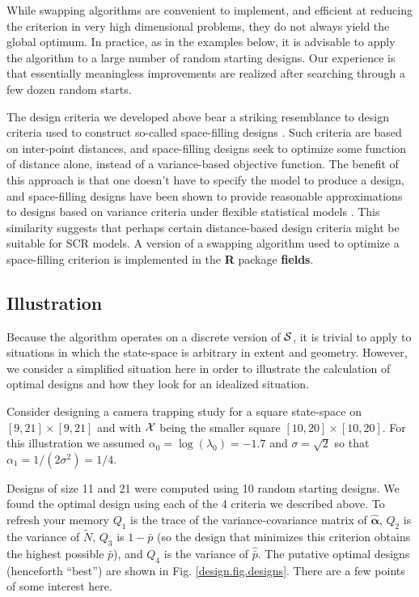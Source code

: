 While swapping algorithms are convenient to implement, and efficient
at reducing the criterion in very high dimensional problems, they do
not always yield the global optimum.  In practice, as in the examples
below, it is advisable to apply the algorithm to a large number of
random starting designs.  Our experience is that essentially
meaningless improvements are realized after searching through a few
dozen random starts.

The design criteria we developed above bear a striking resemblance
to design criteria used to construct so-called space-filling designs
\citep{nychka_etal:1997}. Such criteria are based on inter-point
distances, and space-filling designs seek to optimize some function of
distance alone, instead of a variance-based objective function. The
benefit of this approach is that one doesn't have to specify the model
to produce a design, and space-filling designs have been shown to
provide reasonable approximations to designs based on variance
criteria under flexible
statistical models \citep{nychka_etal:1997}. 
This similarity suggests that perhaps
certain distance-based design criteria might be suitable for SCR
models. A version of a swapping algorithm used to
optimize a space-filling criterion is implemented in the {\bf R}
package {\bf fields}.


\subsection{Illustration}

Because the algorithm operates on a discrete version of ${\cal S}$,
it is trivial to apply to situations in which the
state-space is arbitrary in extent and geometry. However, we consider
a simplified situation here in order to illustrate the calculation of
optimal designs and how they look for an idealized situation.

Consider designing a camera trapping study for a square state-space on
$[9,21] \times [9, 21]$ and with ${\cal X}$ being the smaller square
$[10,20] \times [10,20]$.  For this illustration we assumed
$\alpha_{0} = \log(\lambda_{0}) = -1.7$ and $\sigma=\sqrt{2}$ so that
$\alpha_{1} = 1/(2\sigma^{2}) = 1/4$.

Designs of size 11 and 21 were computed using 10 random starting
designs.  We found the optimal design using each of the 4 criteria we
described above. To refresh your memory $Q_{1}$ is the trace of the
variance-covariance matrix of $\hat{\bm \alpha}$, $Q_{2}$ is the
variance of $\tilde{N}$, $Q_{3}$ is $1-\bar{p}$ (so the design that
minimizes this criterion obtains the highest possible $\bar{p}$), and
$Q_{4}$ is the variance of $\hat{\bar{p}}$.  The putative optimal
designs (henceforth ``best'') are shown in
Fig. \ref{design.fig.designs}. There are a few points of some interest
here.

